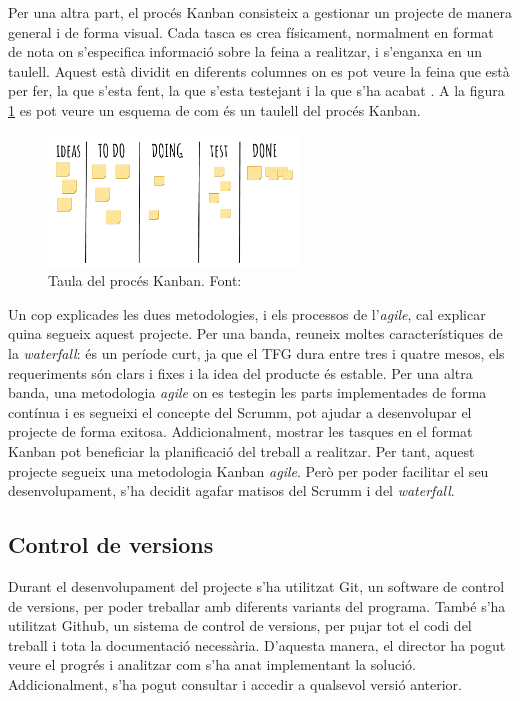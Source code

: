 \documentclass[a4paper]{article}
\begin{document}
Per una altra part, el procés Kanban consisteix a gestionar un projecte de manera general i de forma visual. Cada tasca es crea físicament, normalment en format de nota  on s'especifica informació sobre la feina a realitzar, i s'enganxa en un taulell. Aquest està dividit en diferents columnes on es pot veure la feina que està per fer, la que s'esta fent, la que s'esta testejant i la que s'ha acabat \cite{kanbanWeb}. A la figura \ref{fig:KanbanImage} es pot veure un esquema de com és un taulell del procés Kanban.

\begin{figure}[H]
    \centering
    \includegraphics[width=0.6\textwidth]{images/Kanban.png}
    \caption[Taula del procés Kanban]{Taula del procés Kanban. Font: \cite{kanbanImage}}
    \label{fig:KanbanImage}
\end{figure}

Un cop explicades les dues metodologies, i els processos de l'\textit{agile}, cal explicar quina segueix aquest projecte. Per una banda, reuneix moltes característiques de la \textit{waterfall}: és un període curt, ja que el TFG dura entre tres i quatre mesos, els requeriments són clars i fixes i la idea del producte és estable. Per una altra banda, una metodologia \textit{agile} on es testegin les parts implementades de forma contínua i es segueixi el concepte del Scrumm, pot ajudar a desenvolupar el projecte de forma exitosa. Addicionalment, mostrar les tasques en el format Kanban pot beneficiar la planificació del treball a realitzar. Per tant, aquest projecte segueix una metodologia Kanban \textit{agile}. Però per poder facilitar el seu desenvolupament, s'ha decidit agafar matisos del Scrumm i del \textit{waterfall}.

\subsection{Control de versions}

Durant el desenvolupament del projecte s'ha utilitzat Git, un software de control de versions, per poder treballar amb diferents variants del programa. També s'ha utilitzat Github, un sistema de control de versions, per pujar tot el codi del treball i tota la documentació necessària. D'aquesta manera, el director ha pogut veure el progrés i analitzar com s'ha anat implementant la solució. Addicionalment, s'ha pogut consultar i accedir a qualsevol versió anterior.
\end{document}
